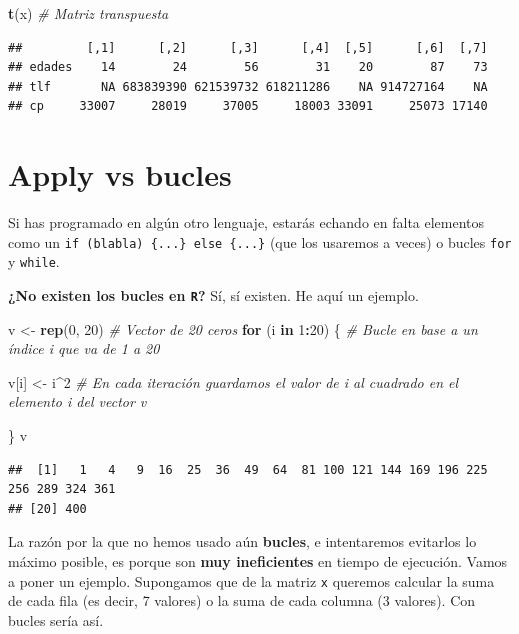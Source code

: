\documentclass[11pt,]{book}
\newenvironment{Shaded}{\begin{snugshade}}{\end{snugshade}}
\newcommand{\CommentTok}[1]{\textcolor[rgb]{0.37,0.37,0.37}{\textit{#1}}}
\newcommand{\ControlFlowTok}[1]{\textcolor[rgb]{0.27,0.27,0.27}{\textbf{#1}}}
\newcommand{\DecValTok}[1]{\textcolor[rgb]{0.06,0.06,0.06}{#1}}
\newcommand{\KeywordTok}[1]{\textcolor[rgb]{0.27,0.27,0.27}{\textbf{#1}}}
\newcommand{\NormalTok}[1]{#1}
\newcommand{\OperatorTok}[1]{\textcolor[rgb]{0.43,0.43,0.43}{\textbf{#1}}}
\newcommand{\StringTok}[1]{\textcolor[rgb]{0.5,0.5,0.5}{#1}}
\begin{document}
\begin{Shaded}
\begin{Highlighting}[]
\KeywordTok{t}\NormalTok{(x) }\CommentTok{# Matriz transpuesta}
\end{Highlighting}
\end{Shaded}

\begin{verbatim}
##         [,1]      [,2]      [,3]      [,4]  [,5]      [,6]  [,7]
## edades    14        24        56        31    20        87    73
## tlf       NA 683839390 621539732 618211286    NA 914727164    NA
## cp     33007     28019     37005     18003 33091     25073 17140
\end{verbatim}

\hypertarget{apply-vs-bucles}{%
\section{Apply vs bucles}\label{apply-vs-bucles}}

Si has programado en algún otro lenguaje, estarás echando en falta elementos como un \texttt{if\ (blabla)\ \{...\}\ else\ \{...\}} (que los usaremos a veces) o bucles \texttt{for} y \texttt{while}.

\textbf{¿No existen los bucles en \texttt{R}?} Sí, sí existen. He aquí un ejemplo.

\begin{Shaded}
\begin{Highlighting}[]
\NormalTok{v <-}\StringTok{ }\KeywordTok{rep}\NormalTok{(}\DecValTok{0}\NormalTok{, }\DecValTok{20}\NormalTok{) }\CommentTok{# Vector de 20 ceros}
\ControlFlowTok{for}\NormalTok{ (i }\ControlFlowTok{in} \DecValTok{1}\OperatorTok{:}\DecValTok{20}\NormalTok{) \{ }\CommentTok{# Bucle en base a un índice i que va de 1 a 20}

\NormalTok{  v[i] <-}\StringTok{ }\NormalTok{i}\OperatorTok{^}\DecValTok{2} \CommentTok{# En cada iteración guardamos el valor de i al cuadrado en el elemento i del vector v}
    
\NormalTok{\}}
\NormalTok{v}
\end{Highlighting}
\end{Shaded}

\begin{verbatim}
##  [1]   1   4   9  16  25  36  49  64  81 100 121 144 169 196 225 256 289 324 361
## [20] 400
\end{verbatim}

La razón por la que no hemos usado aún \textbf{bucles}, e intentaremos evitarlos lo máximo posible, es porque son \textbf{muy ineficientes} en tiempo de ejecución. Vamos a poner un ejemplo. Supongamos que de la matriz \texttt{x} queremos calcular la suma de cada fila (es decir, 7 valores) o la suma de cada columna (3 valores). Con bucles sería así.
\end{document}
